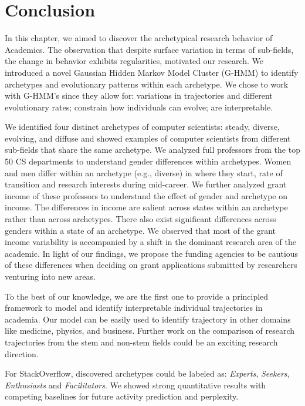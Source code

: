 \section{Conclusion}
\label{sec:conclusion}
In this chapter, we aimed to discover the archetypical research behavior of Academics. The observation that despite surface variation in terms of sub-fields, the change in behavior exhibits regularities, motivated our research. We introduced a novel Gaussian Hidden Markov Model Cluster (G-HMM) to identify archetypes and evolutionary patterns within each archetype. We chose to work with G-HMM's since they allow for: variations in trajectories and different evolutionary rates; constrain how individuals can evolve; are interpretable.

We identified four distinct archetypes of computer scientists: steady, diverse, evolving, and diffuse and showed examples of computer scientists from different sub-fields that share the same archetype. We analyzed full professors from the top 50 CS departments to understand gender differences within archetypes.
Women and men differ within an archetype (e.g., diverse) in where they start, rate of transition and research interests during mid-career. We further analyzed grant income of these professors to understand the effect of gender and archetype on income. The differences in income are salient across states within an archetype rather than across archetypes. There also exist significant differences across genders within a state of an archetype. We observed that most of the grant income variability is accompanied by a shift in the dominant research area of the academic. In light of our findings, we propose the funding agencies to be cautious of these differences when deciding on grant applications submitted by researchers venturing into new areas.

To the best of our knowledge, we are the first one to provide a principled framework to model and identify interpretable individual trajectories in academia. Our model can be easily used to identify trajectory in other domains like medicine, physics, and business. Further work on the comparison of research trajectories from the stem and non-stem fields could be an exciting research direction.

For StackOverflow, discovered archetypes could be labeled as: \emph{Experts}, \emph{Seekers}, \emph{Enthusiasts} and \emph{Facilitators}. We showed strong quantitative results with competing baselines for future activity prediction and perplexity.
